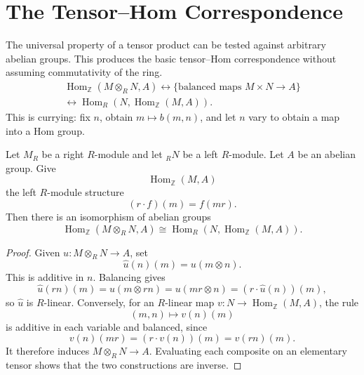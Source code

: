 \section{The Tensor--Hom Correspondence}
The universal property of a tensor product can be tested against arbitrary
abelian groups.  This produces the basic tensor--Hom correspondence without
assuming commutativity of the ring.
\[
\begin{gathered}
\operatorname{Hom}_{\mathbb Z}(M\otimes_RN,A)
\longleftrightarrow
\{\text{balanced maps }M\times N\to A\}\\
\longleftrightarrow
\operatorname{Hom}_R(N,\operatorname{Hom}_{\mathbb Z}(M,A)).
\end{gathered}
\]
This is currying: fix \(n\), obtain \(m\mapsto b(m,n)\), and let \(n\)
vary to obtain a map into a Hom group.

\begin{theorem}\label{thm:tensor-hom}
Let \(M_R\) be a right \(R\)-module and let \({}_RN\) be a left \(R\)-module.
Let \(A\) be an abelian group.  Give
\[
\operatorname{Hom}_{\mathbb Z}(M,A)
\]
the left \(R\)-module structure
\[
(r\cdot f)(m)=f(mr).
\]
Then there is an isomorphism of abelian groups
\[
\operatorname{Hom}_{\mathbb Z}(M\otimes_RN,A)
\cong
\operatorname{Hom}_R\!\left(N,\operatorname{Hom}_{\mathbb Z}(M,A)\right).
\]
\end{theorem}
\begin{proof}
Given \(u:M\otimes_RN\to A\), set
\[
\widehat u(n)(m)=u(m\otimes n).
\]
This is additive in \(n\).  Balancing gives
\[
\widehat u(rn)(m)=u(m\otimes rn)=u(mr\otimes n)
=(r\cdot\widehat u(n))(m),
\]
so \(\widehat u\) is \(R\)-linear.  Conversely, for an \(R\)-linear map
\(v:N\to\operatorname{Hom}_{\mathbb Z}(M,A)\), the rule
\[
(m,n)\longmapsto v(n)(m)
\]
is additive in each variable and balanced, since
\[
v(n)(mr)=(r\cdot v(n))(m)=v(rn)(m).
\]
It therefore induces \(M\otimes_RN\to A\).  Evaluating each composite on an
elementary tensor shows that the two constructions are inverse.
\end{proof}

